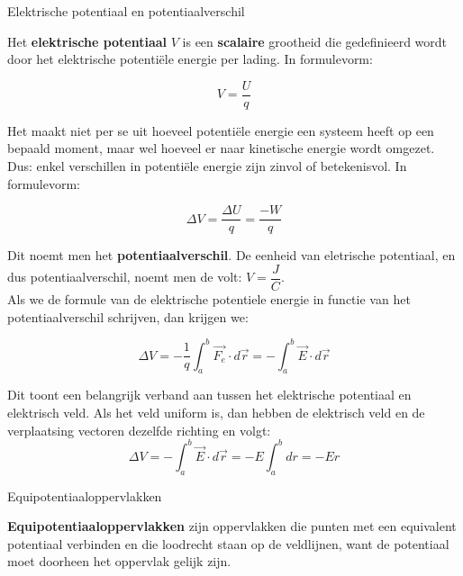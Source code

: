 \begin{theo}{Elektrische potentiaal en potentiaalverschil}

    Het \textbf{elektrische potentiaal} $ V $ is een \textbf{scalaire} grootheid die gedefinieerd wordt door het elektrische potentiële energie per lading. In formulevorm:
    
    \begin{equation*}
        V = \dfrac{U}{q}
    \end{equation*}
    
    \noindent Het maakt niet per se uit hoeveel potentiële energie een systeem heeft op een bepaald moment, maar wel hoeveel er naar kinetische energie wordt omgezet. Dus: enkel verschillen in potentiële energie zijn zinvol of betekenisvol. In formulevorm:
    
    \begin{equation*}
         \Delta V = \dfrac{\Delta U}{q} = \dfrac{-W}{q}
    \end{equation*}
    
    \noindent Dit noemt men het \textbf{potentiaalverschil}. De eenheid van eletrische potentiaal, en dus potentiaalverschil, noemt men de volt: $ V = \dfrac{J}{C} $. \\
    
    \noindent Als we de formule van de elektrische potentiele energie in functie van het potentiaalverschil schrijven, dan krijgen we:
    
    \begin{equation*}
        \Delta V  = -\dfrac{1}{q} \int_a^b \Vec{F_e} \cdot d\Vec{r} = -\int_a^b \Vec{E} \cdot d\Vec{r} 
    \end{equation*}
    
    \noindent Dit toont een belangrijk verband aan tussen het elektrische potentiaal en elektrisch veld. Als het veld uniform is, dan hebben de elektrisch veld en de verplaatsing vectoren dezelfde richting en volgt:
    \begin{equation*}
        \Delta V  = -\int_a^b \Vec{E} \cdot d\Vec{r} = - E \int_a^b dr = -Er
    \end{equation*}
    
\end{theo}

\begin{theo}[Equipotentiaaloppervlakken]{Equipotentiaaloppervlakken}

    \textbf{Equipotentiaaloppervlakken} zijn oppervlakken die punten met een equivalent potentiaal verbinden en die loodrecht staan  op de veldlijnen, want de potentiaal moet doorheen het oppervlak gelijk zijn.
    
\end{theo}

